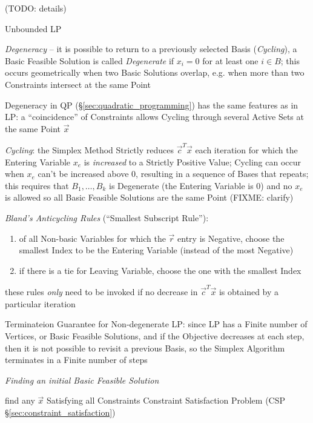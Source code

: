 (TODO: details)

Unbounded LP

\emph{Degeneracy} -- it is possible to return to a previously selected Basis
(\emph{Cycling}), a Basic Feasible Solution is called \emph{Degenerate} if $x_i
= 0$ for at least one $i \in B$; this occurs geometrically when two Basic
Solutions overlap, e.g. when more than two Constraints intersect at the same
Point

\fist Degeneracy in QP (\S\ref{sec:quadratic_programming}) has the same
features as in LP: a ``coincidence'' of Constraints allows Cycling through
several Active Sets at the same Point $\vec{x}$

\emph{Cycling}: the Simplex Method Strictly reduces $\vec{c}^T\vec{x}$ each
iteration for which the Entering Variable $x_e$ is \emph{increased} to a
Strictly Positive Value; Cycling can occur when $x_e$ can't be increased above
$0$, resulting in a sequence of Bases that repeats; this requires that $B_1,
\ldots, B_k$ is Degenerate (the Entering Variable is $0$) and no $x_e$ is
allowed so all Basic Feasible Solutions are the same Point
(FIXME: clarify)

\emph{Bland's Anticycling Rules} (``Smallest Subscript Rule''):
\begin{enumerate}
  \item of all Non-basic Variables for which the $\vec{r}$ entry is Negative,
    choose the smallest Index to be the Entering Variable (instead of the most
    Negative)
  \item if there is a tie for Leaving Variable, choose the one with the
    smallest Index
\end{enumerate}
these rules \emph{only} need to be invoked if no decrease in $\vec{c}^T\vec{x}$
is obtained by a particular iteration

Terminateion Guarantee for Non-degenerate LP: since LP has a Finite number of
Vertices, or Basic Feasible Solutions, and if the Objective decreases at each
step, then it is not possible to revisit a previous Basis, so the Simplex
Algorithm terminates in a Finite number of steps


\emph{Finding an initial Basic Feasible Solution}

find any $\vec{x}$ Satisfying all Constraints \fist Constraint Satisfaction
Problem (CSP \S\ref{sec:constraint_satisfaction})

